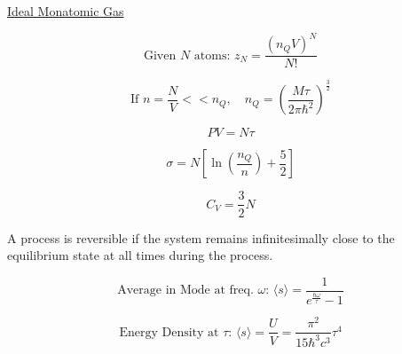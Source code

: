\documentclass[12pt]{article}
\begin{document}
\hline

\begin{center}
  \underline{Ideal Monatomic Gas}
\end{center}

\vspace{-40pt}

\begin{multicols}{2}

  \begin{equation*}
    \text{Given $N$ atoms: }z_N=\frac{(n_QV)^N}{N!}
  \end{equation*}

  \begin{equation*}
    \text{If }n=\frac{N}{V}<<n_Q,\quad n_Q=\left(\frac{M\tau}{2\pi\hbar^2}\right)^{\frac{3}{2}}
  \end{equation*}

\end{multicols}

\vspace{-25pt}

\begin{multicols}{3}

  \begin{equation*}
    PV=N\tau
  \end{equation*}

  \begin{equation*}
    \sigma=N\left[ \ln\left( \frac{n_Q}{n} \right)+\frac{5}{2} \right]
  \end{equation*}

  \begin{equation*}
    C_V=\frac{3}{2}N
  \end{equation*}

\end{multicols}

\hline

\vspace{5pt}

\begin{flushleft}
A process is reversible if the system remains infinitesimally close to the equilibrium state at all times during the process.
\end{flushleft}

\vspace{-30pt}

\begin{multicols}{2}

  \begin{equation*}
    \text{Average in Mode at freq. $\omega$: }\langle s\rangle=\frac{1}{e^{\frac{\hbar\omega}{\tau}}-1}
  \end{equation*}

  \begin{equation*}
    \text{Energy Density at $\tau$: }\langle s\rangle=\frac{U}{V}=\frac{\pi^2}{15\hbar^3c^3}\tau^4
  \end{equation*}

\end{multicols}
\end{document}
